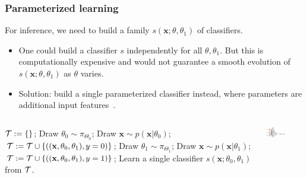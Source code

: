 \documentclass{beamer}
\let\oldcitep=\citep
\renewcommand\citep[1]{\hyperlink{#1}{\oldcitep{#1}}}
\begin{document}
\begin{frame}
    \frametitle{Parameterized learning}

    For inference, we need to build a family $s(\mathbf{x}; \theta, \theta_1)$ of classifiers.

    \begin{itemize}
        \item One could build a classifier $s$ independently for all $\theta, \theta_1$. But this is computationally expensive and would not guarantee a smooth evolution of $s(\mathbf{x}; \theta, \theta_1)$ as $\theta$ varies.

        \item Solution: build a single parameterized classifier instead, where parameters are additional input features~\citep{cranmer2015approximating,Baldi:2016fzo}.

    \end{itemize}

    \begin{columns}
      \begin{column}[b]{0.48\textwidth}
          {\scriptsize
          \begin{algorithmic}
              \State ${\cal T := \{ \}}$;
                  \State Draw $\theta_0 \sim \pi_{\Theta_0}$;
          	    \State Draw $\mathbf{x} \sim p(\mathbf{x}|\theta_0)$;
          		\State ${\cal T} := {\cal T} \cup \{ ((\mathbf{x}, \theta_0, \theta_1), y=0) \}$;
                  \State Draw $\theta_1 \sim \pi_{\Theta_1}$;
          		\State Draw $\mathbf{x} \sim p(\mathbf{x}|\theta_1)$;
          		\State ${\cal T} := {\cal T} \cup \{ ((\mathbf{x}, \theta_0, \theta_1), y=1) \}$;
              \EndWhile
              \State Learn a single classifier $s(\mathbf{x}; \theta_0, \theta_1)$ from ${\cal T}$.
          \end{algorithmic}}
      \end{column}
      \begin{column}[b]{0.48\textwidth}
          \centering
          \includegraphics[width=0.5\textwidth]{figures/networks.png}
          \vspace{1cm}
      \end{column}
    \end{columns}





\end{frame}
\end{document}

